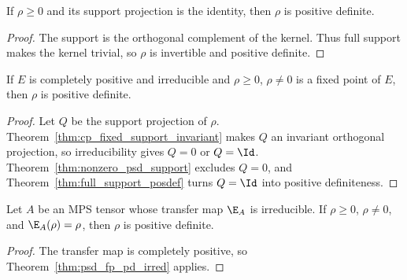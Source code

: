 \begin{theorem}
    \label{thm:full_support_posdef}
    \leanok
    If $\rho\geq0$ and its support projection is the identity, then $\rho$ is
    positive definite.
\end{theorem}

\begin{proof}
    \leanok
    The support is the orthogonal complement of the kernel. Thus full support
    makes the kernel trivial, so $\rho$ is invertible and positive definite.
\end{proof}

\begin{theorem}
    \label{thm:psd_fp_pd_irred}
    \leanok
    If $E$ is completely positive and irreducible and $\rho \ge 0$, $\rho \neq 0$
    is a fixed point of $E$, then $\rho$ is positive definite.
\end{theorem}

\begin{proof}
    \leanok
    Let $Q$ be the support projection of $\rho$.
    Theorem~\ref{thm:cp_fixed_support_invariant} makes $Q$ an invariant
    orthogonal projection, so irreducibility gives $Q=0$ or $Q=\Id$.
    Theorem~\ref{thm:nonzero_psd_support} excludes $Q=0$, and
    Theorem~\ref{thm:full_support_posdef} turns $Q=\Id$ into positive
    definiteness.
\end{proof}

\begin{theorem}
    \label{thm:transfer_psd_fp_pd_irred}
    \leanok
    Let $A$ be an MPS tensor whose transfer map $\E_A$ is irreducible. If
    $\rho\geq0$, $\rho\neq0$, and $\E_A(\rho)=\rho$, then $\rho$ is positive
    definite.
\end{theorem}

\begin{proof}
    \leanok
    The transfer map is completely positive, so
    Theorem~\ref{thm:psd_fp_pd_irred} applies.
\end{proof}

